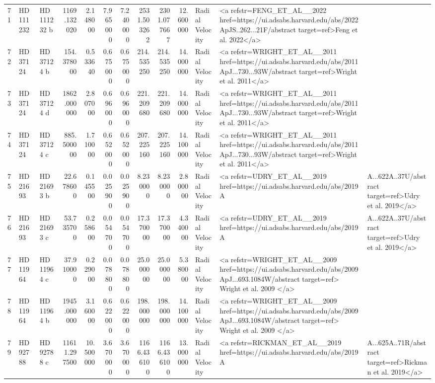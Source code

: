 \begin{tabular}{lllrrrrrrrll}
71 & HD 111232 & HD 111232 b & 1169.132020 & 2.148000 & 7.965000 & 7.240000 & 2531.503262 & 2301.077667 & 12.600000 & Radial Velocity & <a refstr=FENG_ET_AL__2022 href=https://ui.adsabs.harvard.edu/abs/2022ApJS..262...21F/abstract target=ref>Feng et al. 2022</a> \\
72 & HD 37124 & HD 37124 b & 154.378000 & 0.533640 & 0.675000 & 0.675000 & 214.535250 & 214.535250 & 14.000000 & Radial Velocity & <a refstr=WRIGHT_ET_AL__2011 href=https://ui.adsabs.harvard.edu/abs/2011ApJ...730...93W/abstract target=ref>Wright et al. 2011</a> \\
73 & HD 37124 & HD 37124 d & 1862.000000 & 2.807000 & 0.696000 & 0.696000 & 221.209680 & 221.209680 & 14.000000 & Radial Velocity & <a refstr=WRIGHT_ET_AL__2011 href=https://ui.adsabs.harvard.edu/abs/2011ApJ...730...93W/abstract target=ref>Wright et al. 2011</a> \\
74 & HD 37124 & HD 37124 c & 885.500000 & 1.710000 & 0.652000 & 0.652000 & 207.225160 & 207.225160 & 14.100000 & Radial Velocity & <a refstr=WRIGHT_ET_AL__2011 href=https://ui.adsabs.harvard.edu/abs/2011ApJ...730...93W/abstract target=ref>Wright et al. 2011</a> \\
75 & HD 21693 & HD 21693 b & 22.678600 & 0.145500 & 0.025900 & 0.025900 & 8.230000 & 8.230000 & 2.800000 & Radial Velocity & <a refstr=UDRY_ET_AL__2019 href=https://ui.adsabs.harvard.edu/abs/2019A&A...622A..37U/abstract target=ref>Udry et al. 2019</a> \\
76 & HD 21693 & HD 21693 c & 53.735700 & 0.258600 & 0.054700 & 0.054700 & 17.370000 & 17.370000 & 4.340000 & Radial Velocity & <a refstr=UDRY_ET_AL__2019 href=https://ui.adsabs.harvard.edu/abs/2019A&A...622A..37U/abstract target=ref>Udry et al. 2019</a> \\
77 & HD 11964 & HD 11964 c & 37.910000 & 0.229000 & 0.078800 & 0.078800 & 25.000000 & 25.000000 & 5.380000 & Radial Velocity & <a refstr=WRIGHT_ET_AL__2009 href=https://ui.adsabs.harvard.edu/abs/2009ApJ...693.1084W/abstract target=ref> Wright et al. 2009 </a> \\
78 & HD 11964 & HD 11964 b & 1945.000000 & 3.160000 & 0.622000 & 0.622000 & 198.000000 & 198.000000 & 14.100000 & Radial Velocity & <a refstr=WRIGHT_ET_AL__2009 href=https://ui.adsabs.harvard.edu/abs/2009ApJ...693.1084W/abstract target=ref> Wright et al. 2009 </a> \\
79 & HD 92788 & HD 92788 c & 11611.297500 & 10.500000 & 3.670000 & 3.670000 & 1166.436100 & 1166.436100 & 13.000000 & Radial Velocity & <a refstr=RICKMAN_ET_AL__2019 href=https://ui.adsabs.harvard.edu/abs/2019A&A...625A..71R/abstract target=ref>Rickman et al. 2019</a> \\

\end{tabular}

